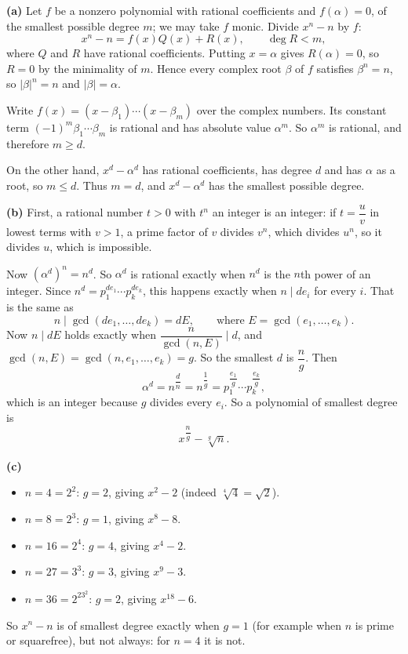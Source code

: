 \textbf{(a)} Let $f$ be a nonzero polynomial with rational coefficients and $f(\alpha)=0$, of the smallest possible degree $m$; we may take $f$ monic. Divide $x^n-n$ by $f$:
\[x^n-n=f(x)Q(x)+R(x),\qquad \deg R<m,\]
where $Q$ and $R$ have rational coefficients. Putting $x=\alpha$ gives $R(\alpha)=0$, so $R=0$ by the minimality of $m$. Hence every complex root $\beta$ of $f$ satisfies $\beta^n=n$, so $|\beta|^n=n$ and $|\beta|=\alpha$.

Write $f(x)=\left(x-\beta_1\right)\cdots\left(x-\beta_m\right)$ over the complex numbers. Its constant term $(-1)^m\beta_1\cdots\beta_m$ is rational and has absolute value $\alpha^m$. So $\alpha^m$ is rational, and therefore $m\ge d$.

On the other hand, $x^d-\alpha^d$ has rational coefficients, has degree $d$ and has $\alpha$ as a root, so $m\le d$. Thus $m=d$, and $x^d-\alpha^d$ has the smallest possible degree.

\textbf{(b)} First, a rational number $t>0$ with $t^n$ an integer is an integer: if $t=\dfrac uv$ in lowest terms with $v>1$, a prime factor of $v$ divides $v^n$, which divides $u^n$, so it divides $u$, which is impossible.

Now $\left(\alpha^d\right)^n=n^d$. So $\alpha^d$ is rational exactly when $n^d$ is the $n$th power of an integer. Since $n^d=p_1^{de_1}\cdots p_k^{de_k}$, this happens exactly when $n\mid de_i$ for every $i$. That is the same as
\[n\mid\gcd\left(de_1,\dots,de_k\right)=dE,\qquad\text{where } E=\gcd\left(e_1,\dots,e_k\right).\]
Now $n\mid dE$ holds exactly when $\dfrac{n}{\gcd(n,E)}\mid d$, and $\gcd(n,E)=\gcd\left(n,e_1,\dots,e_k\right)=g$. So the smallest $d$ is $\dfrac ng$. Then
\[\alpha^{d}=n^{\dfrac{d}{n}}=n^{\dfrac1g}=p_1^{\dfrac{e_1}{g}}\cdots p_k^{\dfrac{e_k}{g}},\]
which is an integer because $g$ divides every $e_i$. So a polynomial of smallest degree is
\[\boxed{x^{\dfrac ng}-\sqrt[g]{n}}.\]

\textbf{(c)}
\begin{itemize}
\item $n=4=2^2$: $g=2$, giving $x^2-2$ (indeed $\sqrt[4]4=\sqrt2$).
\item $n=8=2^3$: $g=1$, giving $x^8-8$.
\item $n=16=2^4$: $g=4$, giving $x^4-2$.
\item $n=27=3^3$: $g=3$, giving $x^9-3$.
\item $n=36=2^23^2$: $g=2$, giving $x^{18}-6$.
\end{itemize}
So $x^n-n$ is of smallest degree exactly when $g=1$ (for example when $n$ is prime or squarefree), but not always: for $n=4$ it is not.

